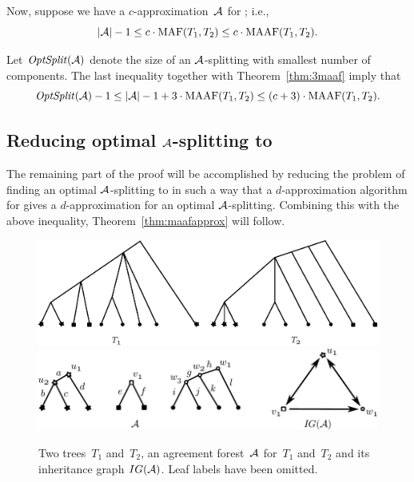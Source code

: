 Now, suppose we have a $c$-approximation~${\mathcal A}$ for \maf; i.e.,
\begin{displaymath}
  |{\mathcal A}|-1 \leq c \cdot \operatorname{MAF}(T_1,T_2) \leq c \cdot \operatorname{MAAF}(T_1,T_2).
\end{displaymath}

Let $\mathit{OptSplit}({\mathcal A})$ denote the size of an ${\mathcal A}$-splitting with smallest number of components. The last inequality together with Theorem~\ref{thm:3maaf} imply that
\begin{displaymath}
  \mathit{OptSplit}({\mathcal A})-1 \leq |{\mathcal A}|-1 + 3 \cdot \operatorname{MAAF}(T_1, T_2) \leq (c+3)\cdot \operatorname{MAAF}(T_1, T_2).
\end{displaymath}

\subsection*{{Reducing optimal ${\mathcal A}$-splitting to \dfvs}}
The remaining part of the proof will be accomplished by reducing the problem of finding an optimal ${\mathcal A}$-splitting to \dfvs in such a way that a $d$-approximation algorithm for \dfvs gives a $d$-approximation for an optimal ${\mathcal A}$-splitting. Combining this with the above inequality, Theorem~\ref{thm:maafapprox} will follow.

\begin{figure}
 \centering
 \includegraphics[scale=.8]{../figs/fig_reduc1.pdf}
 \vspace{.5cm}
 \includegraphics[scale=.9]{../figs/fig_reduc2.pdf}
 \caption{Two trees~$T_1$ and~$T_2$, an agreement forest~${\mathcal A}$ for~$T_1$ and~$T_2$ and its inheritance graph $IG({\mathcal A})$. Leaf labels have been omitted.\label{fig:reduc1}}
\end{figure}

